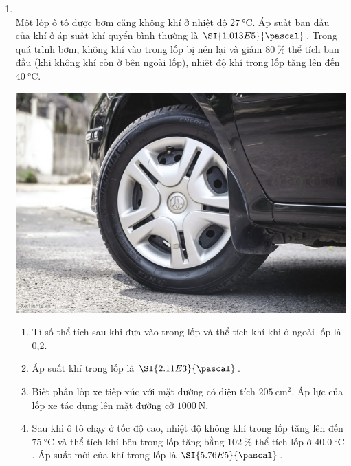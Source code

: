 \begin{enumerate}[label=\bfseries Câu \arabic*:, leftmargin=1.7cm]
\item {}\\
Một lốp ô tô được bơm căng không khí ở nhiệt độ $\SI{27}{\celsius}$. Áp suất ban đầu của khí ở áp suất khí quyển bình thường là $\SI{1.013E5}{\pascal}$. Trong quá trình bơm, không khí vào trong lốp bị nén lại và giảm $\SI{80}{\percent}$ thể tích ban đầu (khi không khí còn ở bên ngoài lốp), nhiệt độ khí trong lốp tăng lên đến $\SI{40}{\celsius}$.
\begin{center}
	\includegraphics[width=0.35\linewidth]{../figs/VN12-Y24-PH-SYL-012P-6}
\end{center}
\begin{enumerate}[label=\alph*)]
	\item Tỉ số thể tích sau khi đưa vào trong lốp và thể tích khí khi ở ngoài lốp là 0,2.
	\item Áp suất khí trong lốp là $\SI{2.11E3}{\pascal}$.
	\item Biết phần lốp xe tiếp xúc với mặt đường có diện tích $\SI{205}{\centi\meter^2}$. Áp lực của lốp xe tác dụng lên mặt đường cỡ $\SI{1000}{\newton}$.
	\item Sau khi ô tô chạy ở tốc độ cao, nhiệt độ không khí trong lốp tăng lên đến $\SI{75}{\celsius}$ và thể tích khí bên trong lốp tăng bằng $\SI{102}{\percent}$ thể tích lốp ở $\SI{40.0}{\celsius}$. Áp suất mới của khí trong lốp là $\SI{5.76E5}{\pascal}$.
	
\end{enumerate}


\end{enumerate}
